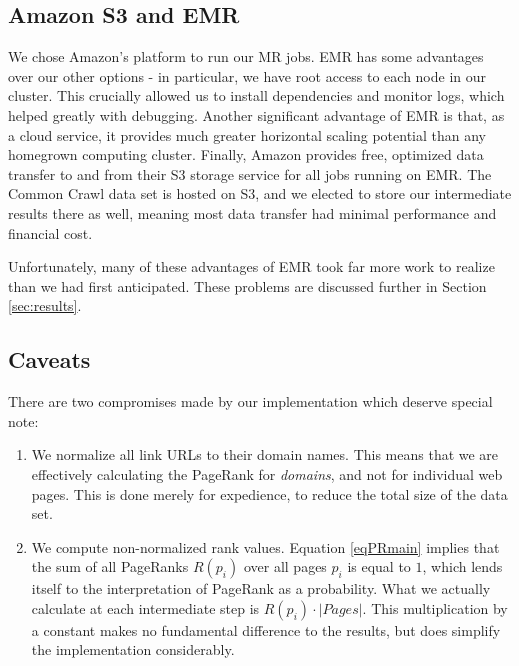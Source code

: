 \subsection{Amazon S3 and EMR}
We chose Amazon's  platform to run our MR jobs.
EMR has some advantages over our other options - in particular, we have root
access to each node in our cluster.  This crucially allowed us to install 
dependencies and monitor logs, which helped greatly with debugging.  Another
significant advantage of EMR is that, as a cloud service, it provides
much greater horizontal scaling potential than any homegrown computing cluster.
Finally, Amazon provides free, optimized data transfer to and from their S3 
storage service for all jobs running on EMR.  The Common Crawl data set is hosted
on S3, and we elected to store our intermediate results there as well, meaning
most data transfer had minimal performance and financial cost.

Unfortunately, many of these advantages of EMR took far more work to realize than
we had first anticipated.  These problems are discussed further in Section \ref{sec:results}.

\subsection{Caveats}
There are two compromises made by our implementation which deserve special note:

\begin{enumerate}
\item We normalize all link URLs to their domain names.  
    This means that we are effectively calculating the PageRank for \emph{domains}, 
    and not for individual web pages.  This is done merely for expedience, to
    reduce the total size of the data set.
\item We compute non-normalized rank values.  Equation \eqref{eqPRmain}
    implies that the sum of all PageRanks $R(p_i)$ over all pages $p_i$ is
    equal to $1$, which lends itself to the interpretation of PageRank as a 
    probability.  What we actually calculate at each intermediate step is
    $R(p_i) \cdot |Pages|$.  This multiplication by a constant makes no 
    fundamental difference to the results, but does simplify the implementation
    considerably.
\end{enumerate}
